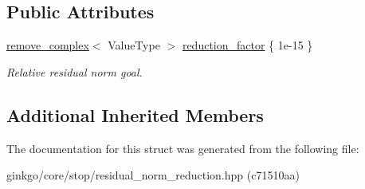 \subsection*{Public Attributes}
\begin{DoxyCompactItemize}
\item 
\mbox{\label{structgko_1_1stop_1_1ResidualNormReduction_1_1parameters__type_a488ffd39d7ea7fc9093a0e7604be2746}} 
\hyperlink{namespacegko_adfcb75c44f6b6c701989419c166f6e7e}{remove\+\_\+complex}$<$ Value\+Type $>$ \hyperlink{structgko_1_1stop_1_1ResidualNormReduction_1_1parameters__type_a488ffd39d7ea7fc9093a0e7604be2746}{reduction\+\_\+factor} \{ 1e-\/15 \}
\begin{DoxyCompactList}\small\item\em Relative residual norm goal. \end{DoxyCompactList}\end{DoxyCompactItemize}
\subsection*{Additional Inherited Members}


The documentation for this struct was generated from the following file\+:\begin{DoxyCompactItemize}
\item 
ginkgo/core/stop/residual\+\_\+norm\+\_\+reduction.\+hpp (c71510aa)\end{DoxyCompactItemize}
